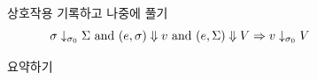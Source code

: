 \documentclass[final]{beamer}
\newlength{\sepwidth}
\newlength{\colwidth}
\newcommand{\separatorcolumn}{\begin{column}{\sepwidth}\end{column}}
\begin{document}
\begin{frame}[t]
\begin{columns}[t]
\begin{column}{\colwidth}
\begin{block}{상호작용 기록하고 나중에 풀기}
        \[\sigma\downarrow_{\sigma_0}\Sigma\text{ and }(e,\sigma)\Downarrow v\text{ and }(e,\Sigma)\Downarrow V\Rightarrow v\downarrow_{\sigma_0} V\]
      \end{block}
      \begin{block}{요약하기}
        \heading{}
      \end{block}
    \end{column}

    \separatorcolumn
  \end{columns}
\end{frame}
\end{document}
